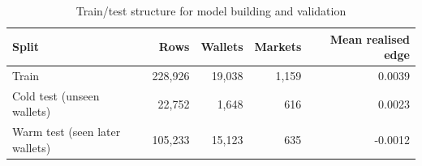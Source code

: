 \documentclass[11pt,a4paper]{article}
\begin{document}
\begin{table}[H]
\centering
\small
\begin{tabular}{lrrrr}
\toprule
Split & Rows & Wallets & Markets & Mean realised edge \\
\midrule
Train & 228,926 & 19,038 & 1,159 & 0.0039 \\
Cold test (unseen wallets) & 22,752 & 1,648 & 616 & 0.0023 \\
Warm test (seen later wallets) & 105,233 & 15,123 & 635 & -0.0012 \\
\bottomrule
\end{tabular}
\caption{Train/test structure for model building and validation}
\label{tab:test_train_struct}
\end{table}

\end{document}
